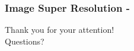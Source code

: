 \documentclass{beamer}
\begin{document}
{
	\begin{frame}
		\frametitle{Image Super Resolution - \cite{ledigPhotoRealisticSingleImage2016}}
	\end{frame}
}


\begin{frame}[standout]
	\begin{center}
	\Large	Thank you for your attention! \hfill \\
	\Large	Questions?
	\end{center}
\end{frame}

\begin{frame}[allowframebreaks]
	 
	
\end{frame}
\end{document}
